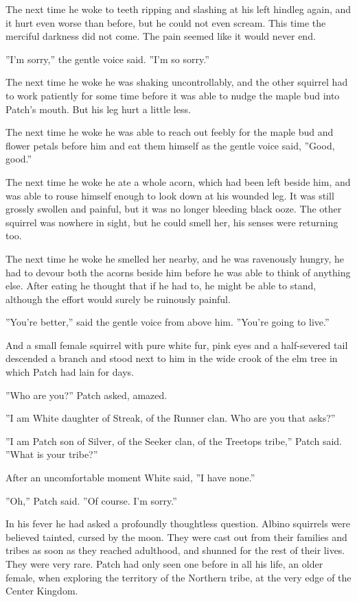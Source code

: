 \documentclass[11pt]{article}
\begin{document}
 The next time he woke to teeth ripping and slashing at his left hindleg again, and it hurt even worse than before, but he could not even scream. This time the merciful darkness did not come. The pain seemed like it would never end.\par
 ''I'm sorry,'' the gentle voice said. ''I'm so sorry.''\par
 The next time he woke he was shaking uncontrollably, and the other squirrel had to work patiently for some time before it was able to nudge the maple bud into Patch's mouth. But his leg hurt a little less.\par
 The next time he woke he was able to reach out feebly for the maple bud and flower petals before him and eat them himself as the gentle voice said, ''Good, good.''\par
 The next time he woke he ate a whole acorn, which had been left beside him, and was able to rouse himself enough to look down at his wounded leg. It was still grossly swollen and painful, but it was no longer bleeding black ooze. The other squirrel was nowhere in sight, but he could smell her, his senses were returning too.\par
 The next time he woke he smelled her nearby, and he was ravenously hungry, he had to devour both the acorns beside him before he was able to think of anything else. After eating he thought that if he had to, he might be able to stand, although the effort would surely be ruinously painful.\par
 ''You're better,'' said the gentle voice from above him. ''You're going to live.''\par
 And a small female squirrel with pure white fur, pink eyes and a half-severed tail descended a branch and stood next to him in the wide crook of the elm tree in which Patch had lain for days.\par
 ''Who are you?'' Patch asked, amazed.\par
 ''I am White daughter of Streak, of the Runner clan. Who are you that asks?''\par
 ''I am Patch son of Silver, of the Seeker clan, of the Treetops tribe,'' Patch said. ''What is your tribe?''\par
 After an uncomfortable moment White said, ''I have none.''\par
 ''Oh,'' Patch said. ''Of course. I'm sorry.''\par
 In his fever he had asked a profoundly thoughtless question. Albino squirrels were believed tainted, cursed by the moon. They were cast out from their families and tribes as soon as they reached adulthood, and shunned for the rest of their lives. They were very rare. Patch had only seen one before in all his life, an older female, when exploring the territory of the Northern tribe, at the very edge of the Center Kingdom.\par
\end{document}
